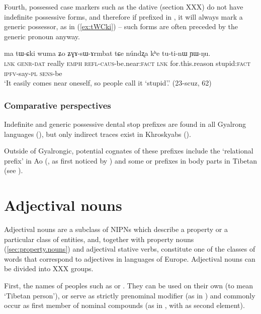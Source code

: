 Fourth, possessed case markers such as the dative  (section XXX) do not have indefinite possessive forms, and therefore if prefixed in , it will always mark a generic possessor, as in (\ref{ex:tWCki}) -- such forms are often preceded by the generic pronoun  anyway.

\begin{exe}
\ex  \label{ex:tWCki}
\gll ma tɯ-ɕki wuma ʑo ʑɣɤ-sɯ-ɤrmbat tɕe núndʐa kʰe tu-ti-nɯ ɲɯ-ŋu. \\
\textsc{lnk} \textsc{genr-dat} really \textsc{emph} \textsc{refl}-\textsc{caus}-be.near:\textsc{fact} \textsc{lnk} for.this.reason stupid:\textsc{fact} \textsc{ipfv}-say-\textsc{pl} \textsc{sens}-be \\
\glt `It easily comes near oneself, so people call it `stupid'.' (23-scuz, 62) 
\end{exe}

\subsubsection{Comparative perspectives} \label{sec:indef.t.comparative}
Indefinite and generic possessive dental stop prefixes are found in all Gyalrong languages (\citealt{jackson98morphology}), but only indirect traces exist in Khroskyabs  (\citealt[155]{lai17khroskyabs}). 

Outside of Gyalrongic, potential cognates of these prefixes include the `relational prefix'  in Ao (\citealt[84-85]{coupe07mongsen}, as first noticed by \citealt[141-2]{wolfenden29outlines}) and some  or  prefixes in body parts in Tibetan (see \citealt{jacques14snom}).

\section{Adjectival nouns} \label{sec:adjectival.nouns}
Adjectival nouns are a subclass of NIPNs which describe a property or a particular class of entities, and, together with property nouns (\ref{sec:property.nouns}) and adjectival stative verbs, constitute one of the classes of words that correspond to adjectives in languages of Europe. Adjectival nouns can be divided into XXX groups.

First, the names of peoples such as  or . They can be used on their own (to mean `Tibetan person'), or serve as strictly prenominal modifier (as in ) and commonly occur as first member of nominal compounds (as in , with  as second element).

